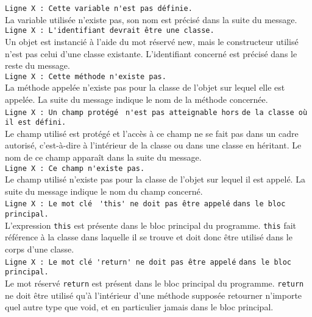 \documentclass[12pt]{article}
\begin{document}
\lstinline!Ligne X : Cette variable n'est pas définie.!\\
La variable utilisée n'existe pas, son nom est précisé
dans la suite du message.\\

\lstinline!Ligne X : L'identifiant devrait être une classe.!\\
Un objet est instancié à l'aide du mot réservé new, mais le constructeur utilisé n'est pas celui d'une classe existante.
 L'identifiant concerné est précisé dans le reste du message.\\

\lstinline!Ligne X : Cette méthode n'existe pas.!\\
La méthode appelée n'existe pas pour la classe de l'objet sur
lequel elle est appelée. La suite du message indique le nom de la méthode concernée.\\

\lstinline!Ligne X : Un champ protégé ! \lstinline!n'est pas atteignable hors!
\lstinline!de la classe où! \lstinline! il est défini.!\\
Le champ utilisé est protégé et l'accès à ce champ ne se fait pas dans un cadre autorisé,
c'est-à-dire à l'intérieur de la classe ou dans une classe en héritant.
 Le nom de ce champ apparaît dans la suite du message.\\

\lstinline!Ligne X : Ce champ n'existe pas.!\\
Le champ utilisé n'existe pas pour la classe de l'objet sur
lequel il est appelé. La suite du message indique le nom du champ concerné.\\

\lstinline!Ligne X : Le mot clé! \lstinline! 'this' ne doit pas être appelé!
\lstinline!dans le bloc principal.!\\
L'expression \verb?this? est présente dans le bloc principal du programme. \verb?this? fait référence à la classe
dans laquelle il se trouve et doit donc être utilisé dans le corps d'une classe.\\

\lstinline!Ligne X : Le mot clé!\lstinline! 'return' ne doit pas être appelé!
\lstinline!dans le bloc principal.!\\
Le mot réservé \verb?return? est présent dans le bloc principal du programme. \verb?return? ne doit être utilisé qu'à
l'intérieur d'une méthode supposée retourner n'importe quel autre type que void, et en particulier
jamais dans le bloc principal.\\
\end{document}
